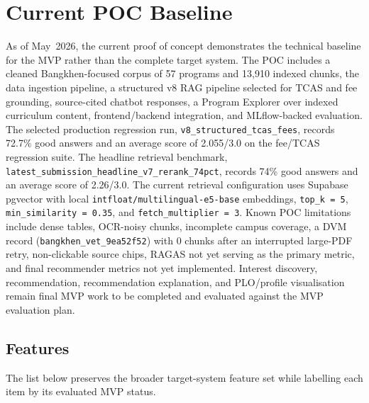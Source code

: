 \section{Current POC Baseline}
\label{section:current-poc-baseline}

As of May~2026, the current proof of concept demonstrates the technical baseline for the MVP rather than the complete target system. The POC includes a cleaned Bangkhen-focused corpus of 57 programs and 13,910 indexed chunks, the data ingestion pipeline, a structured v8 RAG pipeline selected for TCAS and fee grounding, source-cited chatbot responses, a Program Explorer over indexed curriculum content, frontend/backend integration, and MLflow-backed evaluation. The selected production regression run, \texttt{v8\_structured\_tcas\_fees}, records 72.7\% good answers and an average score of 2.055/3.0 on the fee/TCAS regression suite. The headline retrieval benchmark, \texttt{latest\_submission\_headline\_v7\_rerank\_74pct}, records 74\% good answers and an average score of 2.26/3.0. The current retrieval configuration uses Supabase pgvector with local \texttt{intfloat/multilingual-e5-base} embeddings, \texttt{top\_k = 5}, \texttt{min\_similarity = 0.35}, and \texttt{fetch\_multiplier = 3}. Known POC limitations include dense tables, OCR-noisy chunks, incomplete campus coverage, a DVM record (\texttt{bangkhen\_vet\_9ea52f52}) with 0 chunks after an interrupted large-PDF retry, non-clickable source chips, RAGAS not yet serving as the primary metric, and final recommender metrics not yet implemented. Interest discovery, recommendation, recommendation explanation, and PLO/profile visualisation remain final MVP work to be completed and evaluated against the MVP evaluation plan.

\subsection{Features}
\label{subsection:features}

\noindent The list below preserves the broader target-system feature set while labelling each item by its evaluated MVP status.


